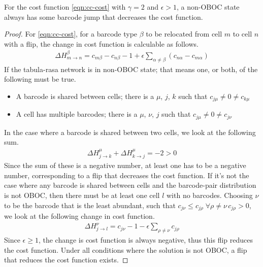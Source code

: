 \documentclass[../dissertation.tex]{subfiles}
\begin{document}
\begin{theorem}[Theorem 2]
    \label{thr:cc-2}
    For the cost function \cref{eqn:cc-cost} with $\gamma = 2$ and $\epsilon > 1$, a non-OBOC state always has some barcode jump that decreases the cost function.
\end{theorem}
\begin{proof}
    For \cref{eqn:cc-cost}, for a barcode type $\beta$ to be relocated from cell $m$ to cell $n$ with a flip, the change in cost function is calculable as follows.
    \begin{align}
        \Delta H^{\beta}_{m \rightarrow n} = c_{m\beta} - c_{n\beta} - 1 + 
        \epsilon \sum_{\alpha \neq \beta} \left( c_{n \alpha} - c_{m \alpha} \right)
    \end{align}
    If the tabula-rasa network is in non-OBOC state; that means one, or both, of the following must be true.
    \begin{itemize}
        \item A barcode is shared between cells; there is a $\mu$, $j$, $k$ such that
            ${c_{j \mu} \neq 0 \neq c_{k \mu}}$
        \item A cell has multiple barcodes; there is a $\mu$, $\nu$, $j$ such that
            ${c_{j \mu} \neq 0 \neq c_{j \nu}}$
    \end{itemize}
    In the case where a barcode is shared between two cells, we look at the following sum.
    \begin{align}
        \Delta H^{\mu}_{j \rightarrow k} + \Delta H^{\mu}_{k \rightarrow j} = -2 > 0
    \end{align}
    Since the sum of these is a negative number, at least one has to be a negative number, corresponding to a flip that decreases the cost function.
    If it's not the case where any barcode is shared between cells and the barcode-pair distribution is not OBOC,
    then there must be at least one cell $l$ with no barcodes.
    Choosing $\nu$ to be the barcode that is the least abundant, such that ${c_{j \nu} \leq c_{j \rho} \; \forall \rho \neq \nu \, c_{j \rho} > 0}$, we look at the following change in cost function.
    \begin{align}
        \Delta H^{\nu}_{j \rightarrow l} = c_{j \nu} - 1 - \epsilon \sum_{\rho \neq \nu} c_{j \rho}
    \end{align}
    Since $\epsilon \geq 1$, the change is cost function is always negative, thus this flip reduces the cost function.
    Under all conditions where the solution is not OBOC, a flip that reduces the cost function exists.
\end{proof}
\end{document}
